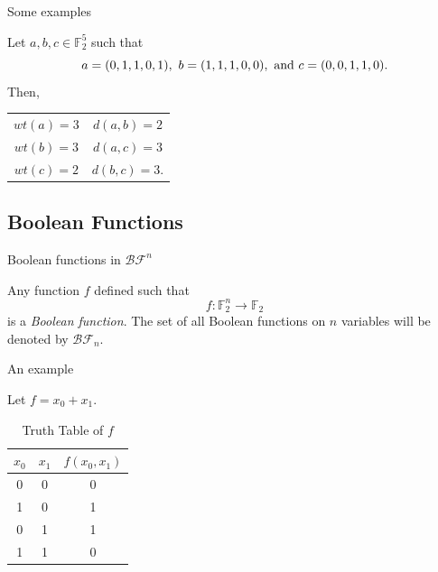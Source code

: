 \documentclass{beamer}
\def\gftwo{\mathbb{F}_2}
\def\BF{\mathcal{BF}}
\begin{document}
\begin{frame}{Some examples}
  \begin{example}
  	Let $a,b,c\in\gftwo^5$ such that
  	\[
  	a=(0,1,1,0,1),\ b=(1,1,1,0,0),\ {\rm and}\ c=(0,0,1,1,0).
  	\]
  	Then,
  	\begin{center}
  		\begin{tabular}{c c}
  			$wt(a)=3$&$d(a,b)=2$\\
  			$wt(b)=3$&$d(a,c)=3$\\
  			$wt(c)=2$&$d(b,c)=3$.\\
  		\end{tabular}
  	\end{center}
  \end{example}
\end{frame}

\subsection{Boolean Functions}
\begin{frame}{Boolean functions in $\BF^n$}
  \begin{definition}
  \label{def:boolean-function}
    Any function $f$ defined such that 
    \begin{equation*}
      f:\gftwo^n\rightarrow\gftwo
    \end{equation*}
    is a {\em Boolean function}. The set of all Boolean functions on $n$
    variables will be denoted by $\BF_n$.
  \end{definition}
\end{frame}

\begin{frame}{An example}
  \begin{example}
    Let $f=x_0+x_1$.
    \begin{table}
    \label{tab:truth-table}
    	\centering
      \begin{tabular}{|c|c||c|}
        \hline
        $x_0$&$x_1$&$f(x_0,x_1)$\\
        \hline
        0&0&0\\
        1&0&1\\
        0&1&1\\
        1&1&0\\
      	\hline
    	\end{tabular}
    	\caption{Truth Table of $f$}
    \end{table}
  \end{example}
\end{frame}
\end{document}

